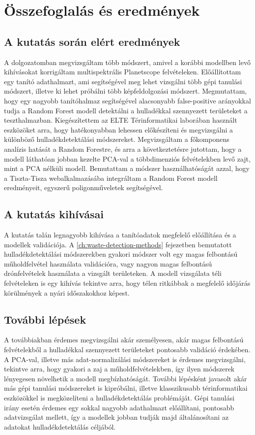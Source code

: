 \chapter{Összefoglalás és eredmények}
\label{ch:sum}

\section{A kutatás során elért eredmények}

A dolgozatomban megvizsgáltam több módszert, amivel a korábbi modellben levő kihívásokat korrigáltam multispektrális Planetscope felvételeken. Előállítottam egy tanító adathalmazt, ami segítségével meg lehet vizsgálni több gépi tanulási módszert, illetve ki lehet próbálni több képfeldolgozási módszert. Megmutattam, hogy egy nagyobb tanítóhalmaz segítségével alacsonyabb false-positive arányokkal tudja a Random Forest modell detektálni a hulladékkal szennyezett területeket a teszthalmazban. Kiegészítettem az ELTE Térinformatikai laborában használt eszközöket arra, hogy hatékonyabban lehessen előkészíteni és megvizsgálni a különböző hulladékdetektálási módszereket. Megvizsgáltam a főkomponens analízis hatását a Random Forestre, és arra a következtetésre jutottam, hogy a modell láthatóan jobban kezelte PCA-val a többdimenziós felvételekben levő zajt, mint a PCA nélküli modell. Bemutattam a módszer használhatóságát azzal, hogy a Tiszta-Tisza webalkalmazásába integráltam a Random Forest modell eredményeit, egyszerű poligonműveletek segítségével.

\section{A kutatás kihívásai}

A kutatás talán legnagyobb kihívása a tanítóadatok megfelelő előállítása és a modellek validációja. A \ref{ch:waste-detection-methods} fejezetben bemutatott hulladékdetektálási módszerekben gyakori módszer volt egy magas felbontású műholdfelvétel használata validációra, vagy nagyon magas felbontású drónfelvételek használata a vizsgált területeken. A modell vizsgálata téli felvételeken is egy kihívás tekintve arra, hogy télen ritkábbak a megfelelő időjárás körülmények a nyári időszakokhoz képest. 

\section{További lépések}

A továbbiakban érdemes megvizsgálni akár személyesen, akár magas felbontású felvételekből a hulladékkal szennyezett területeket pontosabb validáció érdekében. A PCA-val, illetve más adat-normalizálási módszereket is érdemes megvizsgálni, tekintve arra, hogy gyakori a zaj a műholdfelvételekben, így ilyen módszerek lényegesen növelhetik a modell megbízhatóságát. További lépésként javasolt akár más gépi tanulási módszereket is kipróbálni, illetve klasszikusabb térinformatikai eszközökkel is megközelíteni a hulladékdetektálás problémáját. Gépi tanulási irány esetén érdemes egy sokkal nagyobb adathalmazt előállítani, pontosabb adatvizsgálat mellett, így a modellek jobban tudják majd általánosítani az adatokat hulladékdetektálás céljából.
